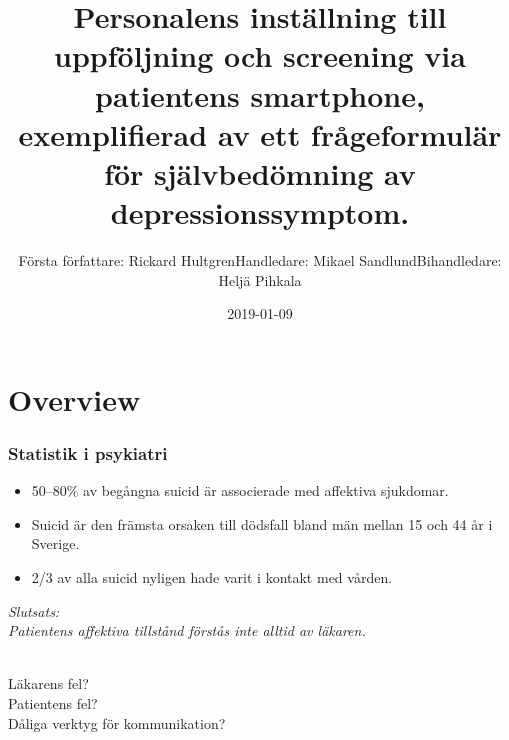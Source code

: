 \documentclass[english]{beamer}
\date{2019-01-09}
\begin{document}
\title{Personalens inst{\"a}llning till uppf{\"o}ljning och screening via patientens smartphone, exemplifierad av ett fr{\aa}geformul{\"a}r f{\"o}r sj{\"a}lvbed{\"o}mning av depressionssymptom.}
\author[]{F{\"o}rsta f{\"o}rfattare: Rickard Hultgren\newline Handledare: Mikael Sandlund\newline Bihandledare: Helj{\"a} Pihkala}


\begin{frame}
	\titlepage
\end{frame}


\section{Overview}
\begin{frame}
	\frametitle{Statistik i psykiatri}

	\begin{itemize}
	\item 50--80\% av beg{\aa}ngna suicid {\"a}r associerade med affektiva sjukdomar.
	\item Suicid {\"a}r den fr{\"a}msta orsaken till d{\"o}dsfall bland m{\"a}n mellan 15 och 44 {\aa}r i Sverige.
	\item 2/3 av alla suicid nyligen hade varit i kontakt med v{\aa}rden.
	\end{itemize}

	\pause

	\textit{Slutsats:\\Patientens affektiva tillst{\aa}nd f{\"o}rst{\aa}s inte alltid av l{\"a}karen.}\\\ \\

\pause

L{\"a}karens fel?\\
Patientens fel?\\
D{\aa}liga verktyg f{\"o}r kommunikation?
\end{frame}
\end{document}
